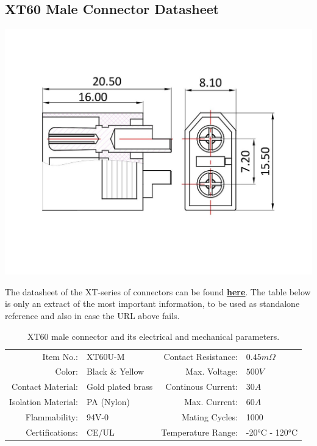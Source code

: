 \clearpage %
\label{xt60}
\subsection{XT60 Male Connector Datasheet}

\includegraphics[width=\textwidth]{contents/figures/xt60_m.jpg}

The datasheet of the XT-series of connectors can be found \href{https://www.lcsc.com/datasheet/lcsc_datasheet_1810251312_Changzhou-Amass-Elec-XT60U-M_C129184.pdf}{\textbf{\underline{here}}}.
The table below is only an extract of the most important information, to be used as standalone reference and also in case the URL above fails.

\begin{table}[h] %
    \begin{tabular}{rlrl}
         Item No.:&  XT60U-M &  Contact Resistance:& $0.45m \Omega$\\
         Color:&  Black \& Yellow&  Max. Voltage:& $500V$\\
         Contact Material:&  Gold plated brass&  Continous Current:& $30A$\\
         Isolation Material:&  PA (Nylon)&  Max. Current:& $60A$\\
         Flammability:&  94V-0&  Mating Cycles:& 1000\\
         Certifications:&  CE/UL&  Temperature Range:& -20°C - 120°C\\
    \end{tabular}
    \caption{XT60 male connector and its electrical and mechanical parameters.}
    \label{xt60_m_specs}
\end{table}


